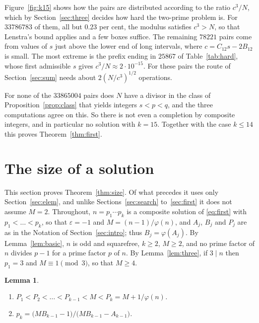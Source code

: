 \documentclass[screen,reqno]{aomart}
\numberwithin{equation}{section}
\theoremstyle{plain}
\newtheorem{lemma}[theorem]{Lemma}
\theoremstyle{definition}
\theoremstyle{remark}
\begin{document}
Figure~\ref{fig:k15} shows how the pairs are distributed according to
the ratio $c^3/N$, which by Section~\ref{sec:three} decides how hard
the two-prime problem is. For $33786783$ of them, all but $0.23$ per
cent, the modulus satisfies $c^3>N$, so that Lenstra's bound applies
and a few boxes suffice. The remaining $78221$ pairs come from values
of $s$ just above the lower end of long intervals, where
$c=C_{12}s-2B_{12}$ is small. The most extreme is the prefix ending in
$25867$ of Table~\ref{tab:hard}, whose first admissible $s$ gives
$c^3/N\approx2\cdot10^{-15}$. For these pairs the route of
Section~\ref{sec:sum} needs about $2(N/c^3)^{1/2}$ operations.

For none of the $33865004$ pairs does $N$ have a divisor in the class of
Proposition~\ref{prop:class} that yields integers $s<p<q$, and the
three computations agree on this. So there is
not even a completion by composite integers, and in particular no
solution with $k=15$. Together with the case $k\le14$ this proves
Theorem~\ref{thm:first}.

\section{The size of a solution}\label{sec:size}

This section proves Theorem~\ref{thm:size}. Of what precedes it uses
only Section~\ref{sec:elem}, and unlike Sections~\ref{sec:search}
to~\ref{sec:first} it does not assume $M=2$. Throughout,
$n=p_1\cdots p_k$ is a composite solution of \eqref{eq:first} with
$p_1<\dots<p_k$, so that $\varepsilon=-1$ and $M=(n-1)/\varphi(n)$,
and $A_j$, $B_j$ and $P_j$ are as in the Notation of
Section~\ref{sec:intro}; thus $B_j=\varphi(A_j)$. By
Lemma~\ref{lem:basic}, $n$ is odd and squarefree, $k\ge2$, $M\ge2$,
and no prime factor of $n$ divides $p-1$ for a prime factor $p$ of
$n$. By Lemma~\ref{lem:three}, if $3\mid n$ then $p_1=3$ and
$M\equiv1\pmod3$, so that $M\ge4$.

\begin{lemma}\label{lem:sizefacts}
\begin{enumerate}[label=\textup{(\roman*)}]
\item $P_1<P_2<\dots<P_{k-1}<M<P_k=M+1/\varphi(n)$.
\item $p_k=\bigl(MB_{k-1}-1\bigr)/\bigl(MB_{k-1}-A_{k-1}\bigr)$.
\end{enumerate}
\end{lemma}
\end{document}
